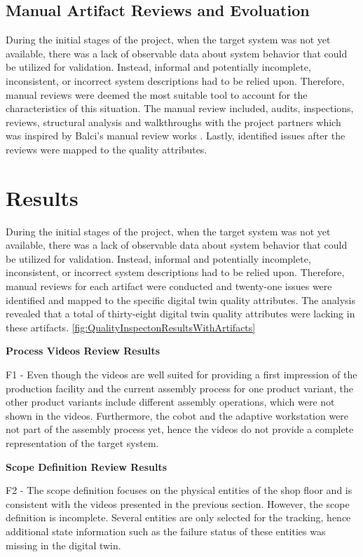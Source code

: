 \documentclass{llncs}
\begin{document}
    \subsection{Manual Artifact Reviews and Evoluation}
    During the initial stages of the project, when the target system was not yet available, there was a lack of observable data about system behavior that could be utilized for validation. 
    Instead, informal and potentially incomplete, inconsistent, or incorrect system descriptions had to be relied upon. Therefore, manual reviews were deemed the most suitable tool to account for the characteristics of this situation.
    The manual review included, audits, inspections, reviews, structural analysis 
    and walkthroughs with the project partners which was inspired by Balci's manual review works \cite{balcitechniques}. Lastly, identified issues after the reviews were mapped to the quality attributes. 
    \section{Results}
    During the initial stages of the project, when the target system was not yet available, there was a 
    lack of observable data about system behavior that could be utilized for validation. Instead, informal and potentially incomplete, inconsistent, or incorrect system descriptions had to be relied upon. 
    Therefore, manual reviews for each artifact were conducted and twenty-one issues were identified and mapped to the specific digital twin quality attributes. 
    The analysis revealed that a total of thirty-eight digital twin quality attributes were lacking in these artifacts. \ref{fig:QualityInspectonResultsWithArtifacts} 

    \textbf{Process Videos Review Results}

    F1  - Even though the videos are well suited for providing a first impression of the production facility and the current assembly process for one product variant, the other product variants include different assembly operations, 
    which were not shown in the videos. Furthermore, the cobot and the adaptive workstation were not part of the assembly process yet, hence the videos do not provide a complete representation of the target system.  

    \textbf{Scope Definition Review Results}

    F2 - The scope definition focuses on the physical entities of the shop floor and is consistent with the videos presented in the previous section. 
    However, the scope definition is incomplete. Several entities are only selected for the tracking, hence additional state information such as the failure status of these entities was missing in the digital twin. 
\end{document}
